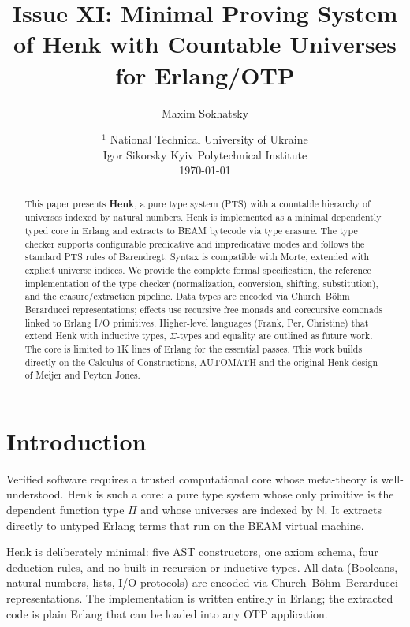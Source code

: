 \documentclass{article}
\begin{document}
\title{Issue XI: Minimal Proving System of Henk with Countable Universes for Erlang/OTP}
\author{Maxim Sokhatsky}
\date{ $^1$ National Technical University of Ukraine \\
       \small Igor Sikorsky Kyiv Polytechnical Institute\\
       \today }

\maketitle

\begin{abstract}
This paper presents \textbf{Henk}, a pure type system (PTS) with a countable hierarchy of universes indexed by natural numbers.
Henk is implemented as a minimal dependently typed core in Erlang and extracts to BEAM bytecode via type erasure.
The type checker supports configurable predicative and impredicative modes and follows the standard PTS rules of Barendregt.
Syntax is compatible with Morte, extended with explicit universe indices. We provide the complete formal specification,
the reference implementation of the type checker (normalization, conversion, shifting, substitution),
and the erasure/extraction pipeline. Data types are encoded via Church--Böhm--Berarducci representations;
effects use recursive free monads and corecursive comonads linked to Erlang I/O primitives.
Higher-level languages (Frank, Per, Christine) that extend Henk with inductive types, $\Sigma$-types and equality are outlined as future work.
The core is limited to 1K lines of Erlang for the essential passes.
This work builds directly on the Calculus of Constructions, AUTOMATH and the original Henk design of Meijer and Peyton Jones.
\end{abstract}

\newpage
\ifincludeTOC
  \tableofcontents
\else
\fi

\newpage
\section{Introduction}
Verified software requires a trusted computational core whose meta-theory is well-understood.
Henk is such a core: a pure type system whose only primitive is the dependent function type $\Pi$ and whose universes are indexed by $\mathbb{N}$.
It extracts directly to untyped Erlang terms that run on the BEAM virtual machine.

Henk is deliberately minimal: five AST constructors, one axiom schema, four deduction rules, and no built-in recursion or inductive types.
All data (Booleans, natural numbers, lists, I/O protocols) are encoded via Church--Böhm--Berarducci representations.
The implementation is written entirely in Erlang; the extracted code is plain Erlang that can be loaded into any OTP application.
\end{document}
